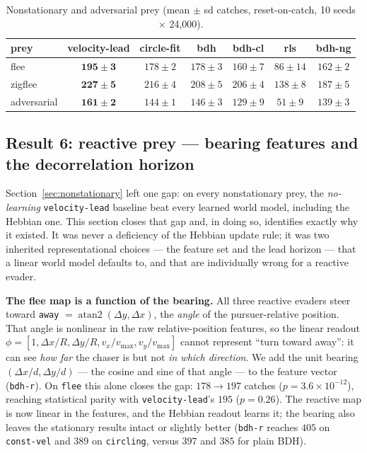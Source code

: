 \documentclass[11pt]{article}
\begin{document}
\begin{table}[t]
\centering
\caption{Nonstationary and adversarial prey (mean $\pm$ sd catches, reset-on-catch, 10 seeds
$\times$ 24{,}000).}
\label{tab:nonstationary}
\small
\begin{tabular}{lcccccc}
\toprule
prey & velocity-lead & circle-fit & bdh & bdh-cl & rls & bdh-ng \\
\midrule
flee       & $\mathbf{195 \pm 3}$ & \emph{$178 \pm 2$} & \emph{$178 \pm 3$} & $160 \pm 7$ & $86 \pm 14$ & $162 \pm 2$ \\
zigflee    & $\mathbf{227 \pm 5}$ & \emph{$216 \pm 4$} & $208 \pm 5$ & $206 \pm 4$ & $138 \pm 8$ & $187 \pm 5$ \\
adversarial& $\mathbf{161 \pm 2}$ & $144 \pm 1$ & \emph{$146 \pm 3$} & $129 \pm 9$ & $51 \pm 9$  & $139 \pm 3$ \\
\bottomrule
\end{tabular}
\end{table}

\subsection{Result 6: reactive prey --- bearing features and the decorrelation
horizon}\label{sec:reactive}

Section~\ref{sec:nonstationary} left one gap: on every nonstationary prey, the \emph{no-learning}
\texttt{velocity-lead} baseline beat every learned world model, including the Hebbian one. This
section closes that gap and, in doing so, identifies exactly why it existed. It was never a
deficiency of the Hebbian update rule; it was two inherited representational choices --- the feature
set and the lead horizon --- that a linear world model defaults to, and that are individually wrong
for a reactive evader.

\textbf{The flee map is a function of the bearing.} All three reactive evaders steer toward
\texttt{away} $= \operatorname{atan2}(\Delta y, \Delta x)$, the \emph{angle} of the
pursuer-relative position. That angle is nonlinear in the raw relative-position features, so the
linear readout $\phi = [1, \Delta x/R, \Delta y/R, v_x/v_{\max}, v_y/v_{\max}]$ cannot represent
``turn toward away'': it can see \emph{how far} the chaser is but not \emph{in which direction}. We
add the unit bearing $(\Delta x/d, \Delta y/d)$ --- the cosine and sine of that angle --- to the
feature vector (\texttt{bdh-r}). On \texttt{flee} this alone closes the gap: $178 \to 197$ catches
($p = 3.6 \times 10^{-12}$), reaching statistical parity with \texttt{velocity-lead}'s $195$
($p = 0.26$). The reactive map is now linear in the features, and the Hebbian readout learns it;
the bearing also leaves the stationary results intact or slightly better (\texttt{bdh-r} reaches
$405$ on \texttt{const-vel} and $389$ on \texttt{circling}, versus $397$ and $385$ for plain BDH).
\end{document}
